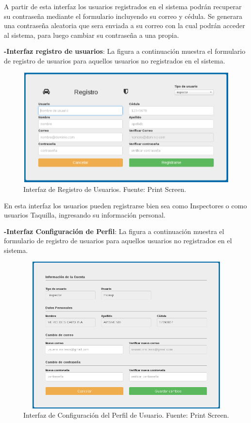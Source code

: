 A partir de esta interfaz los usuarios registrados en el sistema podrán recuperar su contraseña mediante el formulario incluyendo su correo y cédula. Se generara una contraseña aleatoria que sera enviada a su correo con la cual podrán acceder al sistema, para luego cambiar su contraseña a una propia.


\textbf{-Interfaz registro de usuarios}: La figura a continuación muestra el formulario de registro de usuarios para aquellos usuarios no registrados en el sistema.

\begin{figure}[H]
\begin{center}
	\includegraphics[width=14cm,height=6cm]{img/interfaces/registro_usuario.png}
\end{center}
\caption{Interfaz de Registro de Usuarios. Fuente: Print Screen.}
\label{fig:interfaz_registro_usuario}
\end{figure}

En esta interfaz los usuarios pueden registrarse bien sea como Inspectores o como usuarios Taquilla, ingresando su información personal.

\textbf{-Interfaz Configuración de Perfil}: La figura a continuación muestra el formulario de registro de usuarios para aquellos usuarios no registrados en el sistema.

\begin{figure}[H]
\begin{center}
	\includegraphics[width=12cm,height=8cm]{img/interfaces/editar_usuario.png}
\end{center}
\caption{Interfaz de Configuración del Perfil de Usuario. Fuente: Print Screen.}
\label{fig:interfaz_configuracion_usuario}
\end{figure}

